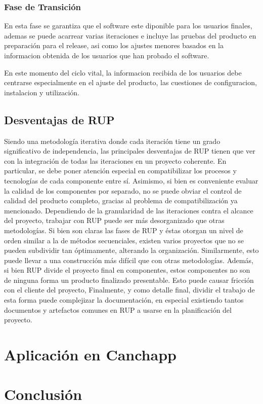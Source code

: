 \documentclass[spanish]{udpreport}
\begin{document}
\subsection{Fase de Transición}
En esta fase se garantiza que el software este diponible para los usuarios finales, ademas se puede acarrear varias iteraciones e incluye las pruebas del producto en preparación para el release, asi como los ajustes menores basados en la informacion obtenida de los usuarios que han probado el software.\par
En este momento del ciclo vital, la informacion recibida de los usuarios debe centrarse especialmente en el ajuste del producto, las cuestiones de configuracion, instalacion y utilización.

\section{Desventajas de RUP}
Siendo una metodología iterativa donde cada iteración tiene un grado significativo de independencia, las principales desventajas de RUP tienen que ver con la integración de todas las iteraciones en un proyecto coherente. En particular, se debe poner atención especial en compatibilizar los procesos y tecnologías de cada componente entre sí. Asimismo, si bien es conveniente evaluar la calidad de los componentes por separado, no se puede obviar el control de calidad del producto completo, gracias al problema de compatibilización ya mencionado.
Dependiendo de la granularidad de las iteraciones contra el alcance del proyecto, trabajar con RUP puede ser más desorganizado que otras metodologías. Si bien son claras las fases de RUP y éstas otorgan un nivel de orden similar a la de métodos secuenciales, existen varios proyectos que no se pueden subdividir tan óptimamente, alterando la organización. Similarmente, esto puede llevar a una construcción más difícil que con otras metodologías.
Además, si bien RUP divide el proyecto final en componentes, estos componentes no son de ninguna forma un producto finalizado presentable. Esto puede causar fricción con el cliente del proyecto, 
Finalmente, y como detalle final, dividir el trabajo de esta forma puede complejizar la documentación, en especial existiendo tantos documentos y artefactos comunes en RUP a usarse en la planificación del proyecto.

\chapter{Aplicación en Canchapp}

\chapter{Conclusión}


\end{document}
